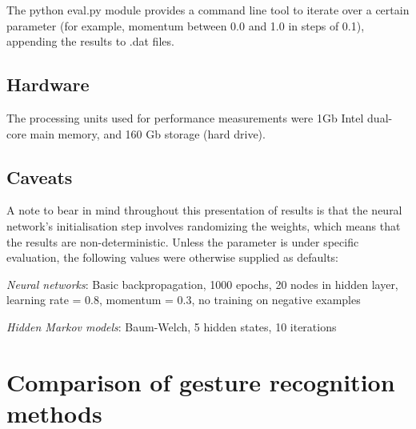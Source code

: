 \documentclass[12pt,a4,notitlepage]{report}
\renewcommand{\_}{\texttt{\symbol{95}}}
\newcommand{\<}{\texttt{\symbol{60}}}
\renewcommand{\>}{\texttt{\symbol{62}}}
\begin{document}
The python eval.py module provides a command line tool to iterate over a certain parameter (for example, momentum between 0.0 and 1.0 in steps of 0.1), appending the results to .dat files.

\subsection{Hardware}

The processing units used for performance measurements were 1Gb Intel dual-core main memory, and 160 Gb storage (hard drive).

\subsection{Caveats}

A note to bear in mind throughout this presentation of results is that the neural network's initialisation step involves randomizing the weights, which means that the results are non-deterministic. Unless the parameter is under specific evaluation, the following values were otherwise supplied as defaults:

\textit{Neural networks}: Basic backpropagation, 1000 epochs, 20 nodes in hidden layer, learning rate = 0.8, momentum = 0.3, no training on negative examples

\textit{Hidden Markov models}: Baum-Welch, 5 hidden states, 10 iterations

\section{Comparison of gesture recognition methods}
\end{document}
